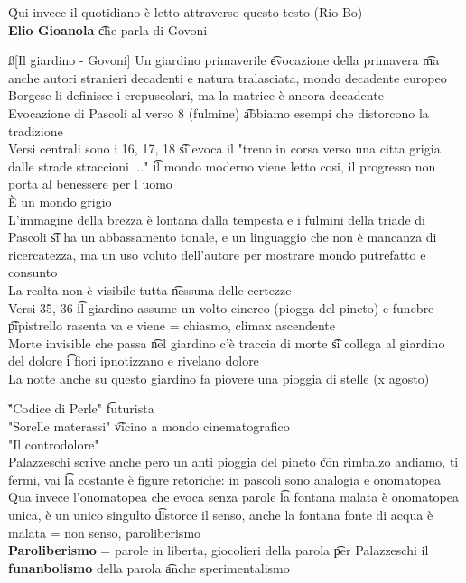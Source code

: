 \documentclass[12pt]{article}
\begin{document}
\v

Qui invece il quotidiano è letto attraverso questo testo (Rio Bo) \\
\textbf{Elio Gioanola} \t che parla di Govoni

\ss[Il giardino - Govoni]
Un giardino primaverile \t evocazione della primavera \t ma anche autori stranieri decadenti e natura tralasciata, mondo decadente europeo \\
Borgese li definisce i crepuscolari, ma la matrice è ancora decadente \\
Evocazione di Pascoli al verso 8 (fulmine) \t abbiamo esempi che distorcono la tradizione \\
Versi centrali sono i 16, 17, 18 \t si evoca il "treno in corsa verso una citta grigia dalle strade straccioni ..." \t il mondo moderno viene letto cosi, il progresso non porta al benessere per l uomo \\
È un mondo grigio \\
L'immagine della brezza è lontana dalla tempesta e i fulmini della triade di Pascoli \t si ha un abbassamento tonale, e un linguaggio che non è mancanza di ricercatezza, ma un uso voluto dell'autore per mostrare mondo putrefatto e consunto \\
La realta non è visibile tutta \t nessuna delle certezze \\
Versi 35, 36 \t il giardino assume un volto cinereo (piogga del pineto) e funebre \t pipistrello rasenta va e viene = chiasmo, climax ascendente \\
Morte invisible che passa \t nel giardino c'è traccia di morte \t si collega al giardino del dolore \t i fiori ipnotizzano e rivelano dolore \\
La notte anche su questo giardino fa piovere una pioggia di stelle (x agosto)

\v

"Codice di Perle" \t futurista \\
"Sorelle materassi" \t vicino a mondo cinematografico \\
"Il controdolore" \\
Palazzeschi scrive anche pero un anti pioggia del pineto \t con rimbalzo andiamo, ti fermi, vai \t la costante è figure retoriche: in pascoli sono analogia e onomatopea \\
Qua invece l'onomatopea che evoca senza parole \t la fontana malata è onomatopea unica, è un unico singulto \t distorce il senso, anche la fontana fonte di acqua è malata = non senso, paroliberismo \\
\textbf{Paroliberismo} = parole in liberta, giocolieri della parola \t per Palazzeschi il \textbf{funanbolismo} della parola \t anche sperimentalismo
\end{document}
